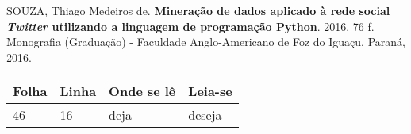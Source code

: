 \begin{errata}
\vspace{\onelineskip}

SOUZA, Thiago Medeiros de. \textbf{Mineração de dados aplicado à rede social \textit{Twitter} utilizando a linguagem de programação Python}. 2016. 76 f. Monografia (Graduação) - Faculdade Anglo-Americano de Foz do Iguaçu, Paraná, 2016.

\begin{table}[htb]
\center
\footnotesize
\begin{tabular}{|p{1.4cm}|p{1cm}|p{3cm}|p{3cm}|}
  \hline
   \textbf{Folha} & \textbf{Linha}  & \textbf{Onde se lê}  & \textbf{Leia-se}  \\
    \hline
    46 & 16 & deja & deseja\\
   \hline
\end{tabular}
\end{table}

\end{errata}